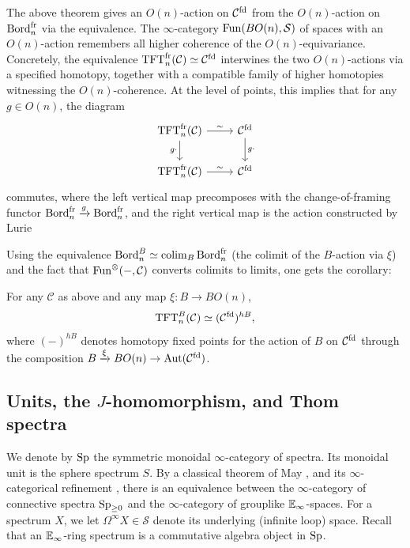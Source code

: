 \documentclass{amsart}
\begin{document}
\begin{remark}\label{rem:CH-action}
The above theorem gives an $O(n)$-action on $\mathcal{C}^{\mathrm{fd}}$ from the $O(n)$-action on $\operatorname{Bord}_n^{\mathrm{fr}}$ via the equivalence.
The $\infty$-category $\operatorname{Fun}(BO(n),\mathcal{S})$ of spaces with an $O(n)$-action remembers all higher coherence of the $O(n)$-equivariance. 
Concretely, the equivalence $\mathrm{TFT}_n^{\mathrm{fr}}(\mathcal{C}) \simeq \mathcal{C}^{\mathrm{fd}}$ interwines the two $O(n)$-actions via a specified homotopy, together with a compatible family of higher homotopies witnessing the $O(n)$-coherence. At the level of points, this implies that for any $g \in O(n)$, the diagram \[\begin{tikzcd}
    \TFT^{\fr}_n(\mathcal{C}) \ar[r, "\sim"] \ar[d, "g\cdot"'] & \mathcal{C}^{\fd} \ar[d, "g\cdot"]\\
    \TFT_n^{\fr}(\mathcal{C}) \ar[r, "\sim"] & \mathcal{C}^{\fd} 
\end{tikzcd}\] commutes, where the left vertical map precomposes with the change-of-framing functor $\operatorname{Bord}_n^{\mathrm{fr}}\xrightarrow[]{g}\operatorname{Bord}^{\mathrm{fr}}_n$, and the right vertical map is the action constructed by Lurie \cite{MR2555928}
\end{remark}



Using the equivalence $\operatorname{Bord}_n^B \simeq \operatorname{colim}_{B} \operatorname{Bord}_n^{\mathrm{fr}}$ (the colimit of the $B$-action via $\xi$) and the fact that $\operatorname{Fun}^{\otimes}(-,\mathcal{C})$ converts colimits to limits, one gets the corollary:
\begin{corollary}\label{cor:CH-tangential}
For any $\mathcal{C}$ as above and any map $\xi\colon B \to BO(n)$,
\[
\mathrm{TFT}_n^B(\mathcal{C}) \simeq (\mathcal{C}^{\mathrm{fd}})^{hB},
\]
where $(-)^{hB}$ denotes homotopy fixed points for the action of $B$ on $\mathcal{C}^{\mathrm{fd}}$ through the composition $B \xrightarrow{\xi} BO(n) \to \operatorname{Aut}(\mathcal{C}^{\mathrm{fd}})$.
\end{corollary}

\subsection{Units, the \texorpdfstring{$J$}{J}-homomorphism, and Thom spectra}\label{sec:units-J}


We denote by $\operatorname{Sp}$ the symmetric monoidal $\infty$-category of spectra. Its monoidal unit is the sphere spectrum $S$. By a classical theorem of May \cite[Theorem 14.4, Corollary 14.5]{may2007geometry}, and its $\infty$-categorical refinement \cite[Remark 5.2.6.26]{Lurie2017HA}, there is an equivalence between the $\infty$-category of connective spectra $\operatorname{Sp}_{\ge 0}$ and the $\infty$-category of grouplike $\mathbb{E}_\infty$-spaces. For a spectrum $X$, we let $\Omega^\infty X \in \mathcal{S}$ denote its underlying (infinite loop) space.
Recall that an $\mathbb{E}_\infty$-ring spectrum is a commutative algebra object in $\operatorname{Sp}$.
\end{document}
